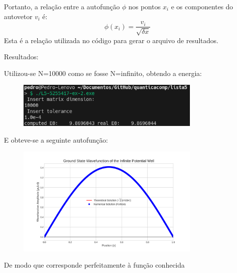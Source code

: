 \documentclass[12pt, a4paper]{article} %
\begin{document}
                Portanto, a relação entre a autofunção $\phi$ nos pontos $x_i$ e os componentes do autovetor $v_i$ é:
                \begin{equation}
                    \phi(x_i) = \frac{v_i}{\sqrt{\delta x}}
                \end{equation}
                Esta é a relação utilizada no código para gerar o arquivo de resultados.

        Resultados:

        Utilizou-se N=10000 como se fosse N=infinito, obtendo a energia:
        \begin{figure}[H]
            \centering
            \includegraphics[width=0.8\textwidth]{../images/ex2.png}
        \end{figure}
        E obteve-se a seguinte autofun\c{c}\~ao:
        \begin{figure}[H]
            \centering
            \includegraphics[width=0.8\textwidth]{../images/wavefunction_plot.png}
        \end{figure}

    De modo que corresponde perfeitamente à fun\c{c}\~ao conhecida
        
\end{document}
